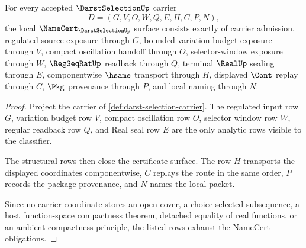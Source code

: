 \begin{theorem}
\label{thm:darst-selection-namecert-obligations}
For every accepted $\DarstSelectionUp$ carrier
$$
D=(G,V,O,W,Q,E,H,C,P,N),
$$
the local $\NameCert_{\DarstSelectionUp}$ surface consists exactly of carrier admission, regulated source exposure through $G$, bounded-variation budget exposure through $V$, compact oscillation handoff through $O$, selector-window exposure through $W$, $\RegSeqRatUp$ readback through $Q$, terminal $\RealUp$ sealing through $E$, componentwise $\hsame$ transport through $H$, displayed $\Cont$ replay through $C$, $\Pkg$ provenance through $P$, and local naming through $N$.
\end{theorem}
\begin{proof}
Project the carrier of \autoref{def:darst-selection-carrier}. The regulated input row $G$, variation budget row $V$, compact oscillation row $O$, selector window row $W$, regular readback row $Q$, and Real seal row $E$ are the only analytic rows visible to the classifier.

The structural rows then close the certificate surface. The row $H$ transports the displayed coordinates componentwise, $C$ replays the route in the same order, $P$ records the package provenance, and $N$ names the local packet.

Since no carrier coordinate stores an open cover, a choice-selected subsequence, a host function-space compactness theorem, detached equality of real functions, or an ambient compactness principle, the listed rows exhaust the NameCert obligations.
\end{proof}

